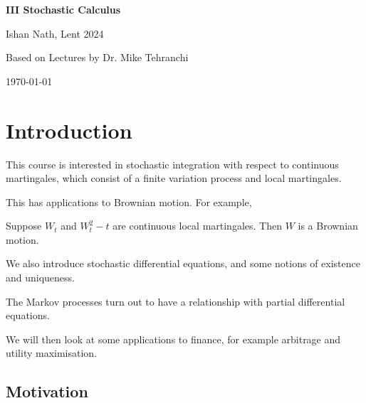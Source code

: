 \documentclass[12pt]{article}
\begin{document}
\hypersetup{pageanchor=false}
\begin{titlepage}
	\begin{center}
		\vspace*{1em}
		\Huge
		\textbf{III Stochastic Calculus}

		\vspace{1em}
		\large
		Ishan Nath, Lent 2024

		\vspace{1.5em}

		\Large

		Based on Lectures by Dr. Mike Tehranchi

		\vspace{1em}

		\large
		\today
	\end{center}
	
\end{titlepage}
\hypersetup{pageanchor=true}

\tableofcontents

\newpage


\setcounter{section}{-1}

\section{Introduction}%
\label{sec:int}

This course is interested in stochastic integration with respect to continuous martingales, which consist of a finite variation process and local martingales.

This has applications to Brownian motion. For example,
\begin{proposition}[L\'evy]
	Suppose $W_t$ and $W_t^2-t$ are continuous local martingales. Then $W$ is a Brownian motion.
\end{proposition}

We also introduce stochastic differential equations, and some notions of existence and uniqueness.

The Markov processes turn out to have a relationship with partial differential equations.

We will then look at some applications to finance, for example arbitrage and utility maximisation.

\subsection{Motivation}%
\label{sub:mot}
\end{document}
